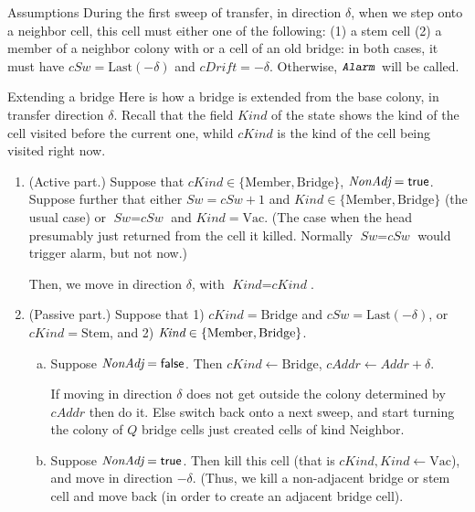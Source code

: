 \documentclass[12pt]{memoir}
\newcommand{\fld}[1]{\ensuremath{\textit{#1}}}
\newcommand{\rul}[1]{\ensuremath{\texttt{\slshape #1\/}}}
\newcommand{\Addr}{\fld{Addr}}
\newcommand{\cAddr}{\fld{cAddr}}
\newcommand{\cDrift}{\fld{cDrift}}
\newcommand{\NonAdj}{\fld{NonAdj}}
\newcommand{\Kind}{\fld{Kind}}
\newcommand{\cKind}{\fld{cKind}}
\newcommand{\Sweep}{\fld{Sw}}
\newcommand{\cSweep}{\fld{cSw}}
\newcommand{\Bridge}{\mathrm{Bridge}}
\newcommand{\Last}{\mathrm{Last}}
\newcommand{\Member}{\mathrm{Member}}
\newcommand{\Neighbor}{\mathrm{Neighbor}}
\newcommand{\Stem}{\mathrm{Stem}}
\newcommand{\Vacant}{\mathrm{Vac}}
\newcommand{\Alarm}{\rul{Alarm}}
\begin{document}
    \begin{flushdescription}
    \item [Assumptions]
      During the first sweep of transfer, in direction \( \delta \), 
      when we step onto a neighbor cell, this cell must either one of the following:
      (1) a stem cell (2) a member of a neighbor colony with or a cell of an old bridge: in
both cases, it must have \( \cSweep = \Last(-\delta) \) and \( \cDrift=-\delta \).
      Otherwise, \( \Alarm \) will be called.

     \item [Extending a bridge]
       Here is how a bridge is extended from the base colony, in 
transfer direction \( \delta \).
Recall that the field \( \Kind \) of the state shows the kind of the cell visited
before the current one, whild \( \cKind \) is the kind of the cell being visited right now.

\begin{enumerate}[1.]

\item
  \begin{sloppypar}
 (Active part.)
  Suppose that \( \cKind \in \{\Member,\Bridge\} \), \( \NonAdj=\true \).
Suppose further that either \( \Sweep=\cSweep+1 \) 
and \( \Kind\in\{\Member,\Bridge\} \) (the usual case)
or \( \Sweep=\cSweep \) and \( \Kind  = \Vacant \).
(The case when the head presumably just returned from the cell it killed.
Normally \( \Sweep=\cSweep \) would trigger alarm, but not now.)    
  \end{sloppypar}

 Then, we move in direction \( \delta \), with \( \Kind=\cKind \).

\item(Passive part.)
 Suppose that 1) \( \cKind =\Bridge \) and \( \cSweep=\Last(-\delta) \),
or \( \cKind=\Stem \), and 2) \( \Kind  \in \set{\Member, \Bridge} \).

 \begin{enumerate}[a.]
 \item Suppose \( \NonAdj = \false \).
Then \( \cKind \gets \Bridge \), \( \cAddr\gets\Addr+\delta \).

If moving in direction \( \delta \) does not get outside the colony determined by \( \cAddr \)
then do it.
Else switch back onto a next sweep, and start turning the colony of \( Q \) 
bridge cells just created cells of kind \( \Neighbor \).

 \item Suppose \( \NonAdj=\true \).
Then kill this cell (that is \( \cKind,\Kind \gets \Vacant \)), 
and move in direction \( -\delta \).
(Thus, we kill a non-adjacent bridge or stem cell and move back (in order 
to create an adjacent bridge cell).
\end{enumerate}


\end{enumerate}
\end{flushdescription}
\end{document}
